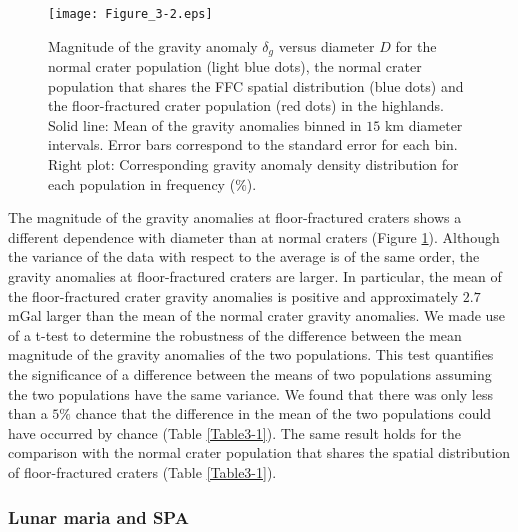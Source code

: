\begin{figure}[h!]
  \graphicspath{ {/Users/thorey/Documents/These/Projet/FFC/Gravi_GRAIL/Article/Papier/Proof/} }
  \begin{center}

    \texttt{[image: Figure\_3-2.eps]}
    \caption{Magnitude  of  the   gravity  anomaly  $\delta_g$  versus
      diameter $D$ for the normal crater population (light blue dots),
      the  normal  crater  population  that  shares  the  FFC  spatial
      distribution   (blue  dots)   and  the   floor-fractured  crater
      population (red dots) in the  highlands. Solid line: Mean of the
      gravity anomalies  binned in $15$ km  diameter intervals.  Error
      bars correspond to the standard error for each bin.  Right plot:
      Corresponding  gravity  anomaly  density distribution  for  each
      population in frequency ($\%$).}
    \label{C6-Figure3-2}
  \end{center}
\end{figure}

The  magnitude of  the  gravity anomalies  at floor-fractured  craters
shows  a different  dependence with  diameter than  at normal  craters
(Figure \ref{C6-Figure3-2}).   Although the variance of  the data with
respect to the average is of  the same order, the gravity anomalies at
floor-fractured craters  are larger.  In  particular, the mean  of the
floor-fractured crater gravity anomalies is positive and approximately
$2.7$  mGal  larger  than  the  mean  of  the  normal  crater  gravity
anomalies.  We made use of a t-test to determine the robustness of the
difference between the mean magnitude  of the gravity anomalies of the
two  populations.    This  test  quantifies  the   significance  of  a
difference  between the  means  of two  populations  assuming the  two
populations have the same variance.  We found that there was only less
than  a $5\%$  chance  that the  difference  in the  mean  of the  two
populations could have occurred by chance (Table \ref{Table3-1}).  The
same result holds for the comparison with the normal crater population
that  shares  the  spatial  distribution  of  floor-fractured  craters
(Table \ref{Table3-1}).

\subsubsection{Lunar maria and SPA}
\label{C6-sec:lunar-maria-spa}
  
